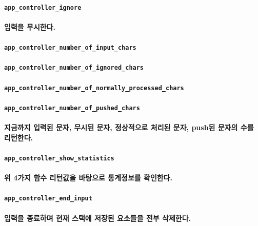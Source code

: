 \documentclass[UTF8]{report}
\begin{document}
            \paragraph{\texttt{app\_controller\_ignore}}
            \paragraph{%
                \normalfont 입력을 무시한다.
            }

            \paragraph{\texttt{app\_controller\_number\_of\_input\_chars}}
            \paragraph{\texttt{app\_controller\_number\_of\_ignored\_chars}}
            \paragraph{\texttt{app\_controller\_number\_of\_normally\_processed\_chars}}
            \paragraph{\texttt{app\_controller\_number\_of\_pushed\_chars}}
            \paragraph{%
                \normalfont 지금까지 입력된 문자, 무시된 문자, 정상적으로 처리된 문자, push된 문자의 수를 리턴한다.
            }

            \paragraph{\texttt{app\_controller\_show\_statistics}}
            \paragraph{%
                \normalfont 위 4가지 함수 리턴값을 바탕으로 통계정보를 확인한다.
            }

            \paragraph{\texttt{app\_controller\_end\_input}}
            \paragraph{%
                \normalfont 입력을 종료하며 현재 스택에 저장된 요소들을 전부 삭제한다.
            }
\end{document}
